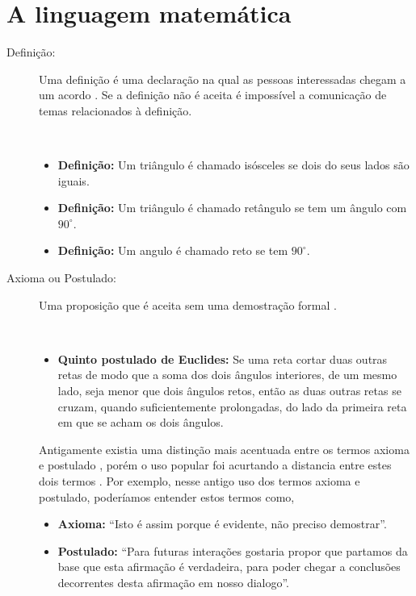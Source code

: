 
\section{A linguagem matemática}

\begin{description}

\item[Definição:]  Uma definição é uma declaração na qual as pessoas interessadas chegam a um acordo \cite[pp. 37]{solow1987como}.
Se a definição não é aceita é impossível a comunicação de temas relacionados à definição.
\begin{example}~\\
\begin{itemize}
\item \textbf{Definição:} Um triângulo é chamado isósceles se dois do seus lados são iguais.
\item \textbf{Definição:} Um triângulo é chamado retângulo se tem um ângulo com $90^{\circ}$.
\item \textbf{Definição:} Um angulo é chamado reto se tem  $90^{\circ}$.
\end{itemize}
\end{example}

\item[Axioma ou Postulado:]   
Uma proposição que é aceita sem uma demostração formal \cite[pp. 47]{fossa2009introducao} \cite[pp. 41]{solow1987como}.
\begin{example}~\\
\begin{itemize}
\item \textbf{Quinto postulado de Euclides:} Se uma reta cortar duas outras retas de modo que a soma dos dois ângulos interiores, de um mesmo lado, seja menor que dois ângulos retos, então as duas outras retas se cruzam, quando suficientemente prolongadas, do lado da primeira reta em que se acham os dois ângulos.
\end{itemize}
\end{example}

Antigamente existia uma distinção mais acentuada entre os termos axioma e postulado \cite[pp. 115]{de1863ensaio},
porém o uso popular foi acurtando a distancia entre estes dois termos \cite[pp. 243]{mora2000dicionario}.
Por exemplo, nesse antigo uso dos termos axioma e postulado, poderíamos entender estos termos como,
\begin{itemize}
\item \textbf{Axioma:} ``Isto é assim porque é evidente, não preciso demostrar''.
\item \textbf{Postulado:} ``Para futuras interações gostaria propor que partamos da base que esta afirmação é verdadeira,
 para poder chegar a conclusões decorrentes desta afirmação em nosso dialogo''.
\end{itemize}



\end{description}
